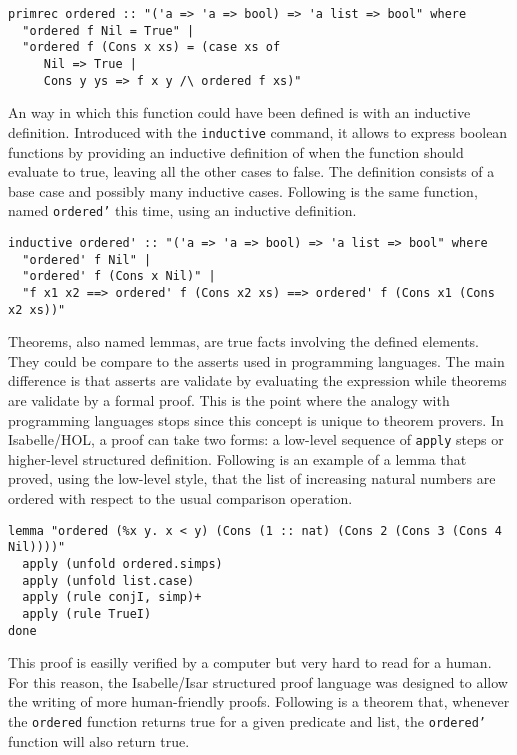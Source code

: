 \documentclass[a4paper, oneside, 12pt, titlepage]{article}
\begin{document}
\begin{verbatim}
primrec ordered :: "('a => 'a => bool) => 'a list => bool" where
  "ordered f Nil = True" |
  "ordered f (Cons x xs) = (case xs of
     Nil => True |
     Cons y ys => f x y /\ ordered f xs)"
\end{verbatim}

An way in which this function could have been defined is with an inductive definition. Introduced
with the \texttt{inductive} command, it allows to express boolean functions by providing an
inductive definition of when the function should evaluate to true, leaving all the other cases to
false. The definition consists of a base case and possibly many inductive cases. Following is the
same function, named \texttt{ordered'} this time, using an inductive definition.

\begin{verbatim}
inductive ordered' :: "('a => 'a => bool) => 'a list => bool" where
  "ordered' f Nil" |
  "ordered' f (Cons x Nil)" |
  "f x1 x2 ==> ordered' f (Cons x2 xs) ==> ordered' f (Cons x1 (Cons x2 xs))"
\end{verbatim}

Theorems, also named lemmas, are true facts involving the defined elements. They could be compare to
the asserts used in programming languages. The main difference is that asserts are validate by
evaluating the expression while theorems are validate by a formal proof. This is the point where the
analogy with programming languages stops since this concept is unique to theorem provers. In
Isabelle/HOL, a proof can take two forms: a low-level sequence of \texttt{apply} steps or
higher-level structured definition. Following is an example of a lemma that proved, using the
low-level style, that the list of increasing natural numbers are ordered with respect to the usual
comparison operation.

\begin{verbatim}
lemma "ordered (%x y. x < y) (Cons (1 :: nat) (Cons 2 (Cons 3 (Cons 4 Nil))))"
  apply (unfold ordered.simps)
  apply (unfold list.case)
  apply (rule conjI, simp)+
  apply (rule TrueI)
done
\end{verbatim}

This proof is easilly verified by a computer but very hard to read for a human. For this reason,
the Isabelle/Isar structured proof language was designed to allow the writing of more human-friendly
proofs. Following is a theorem that, whenever the \texttt{ordered} function returns true for a given
predicate and list, the \texttt{ordered'} function will also return true.
\end{document}
